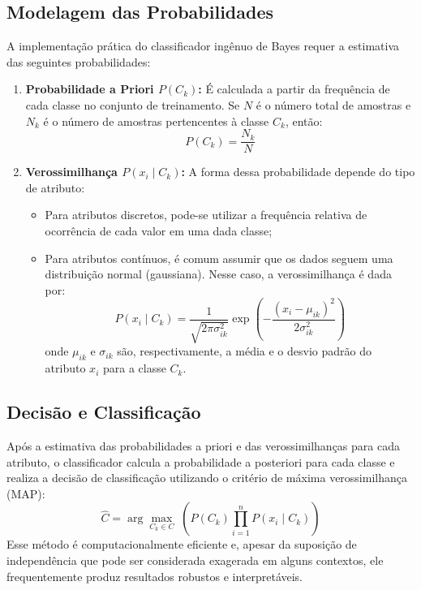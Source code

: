 \documentclass[conference]{IEEEtran}
\begin{document}
\subsection{Modelagem das Probabilidades}
A implementação prática do classificador ingênuo de Bayes requer a estimativa das seguintes probabilidades:
\begin{enumerate}
    \item \textbf{Probabilidade a Priori $P(C_k)$:} É calculada a partir da frequência de cada classe no conjunto de treinamento. Se $N$ é o número total de amostras e $N_k$ é o número de amostras pertencentes à classe $C_k$, então:
    \[
    P(C_k) = \frac{N_k}{N}
    \]
    \item \textbf{Verossimilhança $P(x_i \mid C_k)$:} A forma dessa probabilidade depende do tipo de atributo:
    \begin{itemize}
        \item Para atributos discretos, pode-se utilizar a frequência relativa de ocorrência de cada valor em uma dada classe;
        \item Para atributos contínuos, é comum assumir que os dados seguem uma distribuição normal (gaussiana). Nesse caso, a verossimilhança é dada por:
        \[
        P(x_i \mid C_k) = \frac{1}{\sqrt{2\pi\sigma_{ik}^2}} \exp\left( -\frac{(x_i - \mu_{ik})^2}{2\sigma_{ik}^2} \right)
        \]
        onde $\mu_{ik}$ e $\sigma_{ik}$ são, respectivamente, a média e o desvio padrão do atributo $x_i$ para a classe $C_k$.
    \end{itemize}
\end{enumerate}

\subsection{Decisão e Classificação}
Após a estimativa das probabilidades a priori e das verossimilhanças para cada atributo, o classificador calcula a probabilidade a posteriori para cada classe e realiza a decisão de classificação utilizando o critério de máxima verossimilhança (MAP):
\[
\hat{C} = \arg \max_{C_k \in C} \; \left( P(C_k) \prod_{i=1}^{n} P(x_i \mid C_k) \right)
\]
Esse método é computacionalmente eficiente e, apesar da suposição de independência que pode ser considerada exagerada em alguns contextos, ele frequentemente produz resultados robustos e interpretáveis.
\end{document}

